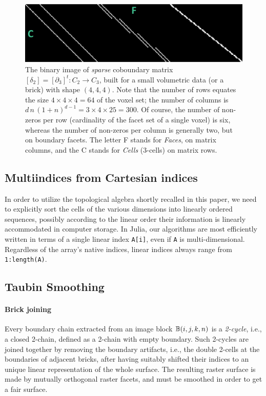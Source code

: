 \begin{figure}[tbp] %
   \centering
   \includegraphics[width=0.75\linewidth]{figs/boundary_matrix_4x4x4_desc.png} 
   \caption{
   The binary image of \emph{sparse} coboundary matrix  $\left[\delta_2\right] = \left[\partial_3\right]^t : C_2 \to C_3$,
   built for a small volumetric data (or a brick) with shape $(4,4,4)$. Note that the number of rows equates the size $4\times 4\times 4 = 64$ of the voxel set; the number of columns is $d\,n\,(1+n)^{d-1} = 3\times 4\times 25 = 300$. Of course, the number of non-zeros per row (cardinality of the facet set of a single voxel) is six, whereas the number of non-zeros per column is generally two, but on boundary facets. The letter F stands for \emph{Faces}, on matrix columns, and the C stands for \emph{Cells} (3-cells) on matrix rows.}
   \label{fig:boundary_matrix_4x4x4}
\end{figure}

\subsection{Multiindices from Cartesian indices}\label{sec:inds-from-cart}

In order to utilize the topological algebra shortly recalled in this paper, we need to explicitly sort the cells of the various dimensions into linearly ordered sequences, possibly according to the linear order their information is linearly accommodated in computer storage. In Julia, our algorithms are most efficiently written in terms of a single linear index \texttt{A[i]}, even if \texttt{A} is multi-dimensional. Regardless of the array's native indices, linear indices always range from \texttt{1:length(A)}. 

\subsection{Taubin Smoothing}\label{sec:taubin}

\paragraph{Brick joining}
Every boundary chain extracted from an image block $\mathbb{B}(i,j,k,n)$ is a \emph{2-cycle}, i.e., a closed 2-chain, defined as a 2-chain with empty boundary. Such 2-cycles are joined together by removing the boundary artifacts, i.e., the double 2-cells at the boundaries of adjacent bricks, after having suitably shifted their indices to an unique linear representation of the whole surface. 
The resulting raster surface is made by mutually orthogonal raster facets, and must be smoothed in order to get a fair surface. 



